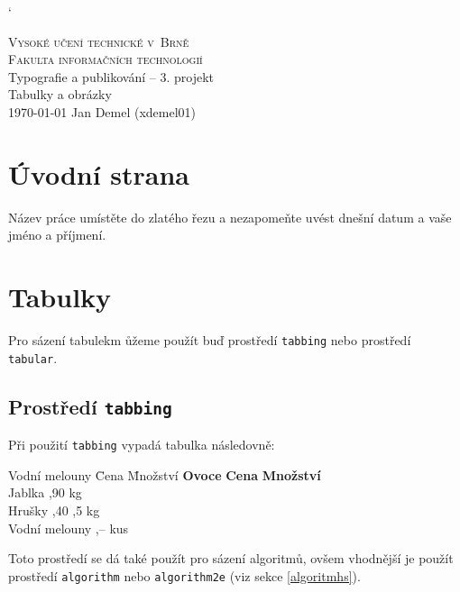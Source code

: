 \documentclass[a4paper, 11pt]{article}
\begin{document}
\catcode`

    \begin{titlepage}
        \begin{center}
            {\Huge\textsc{
                Vysoké učení technické v~Brně\\
            }}
            {\huge\textsc{
                Fakulta informačních technologií\\
            }}
    		{\LARGE
    			Typografie a publikování – 3. projekt \\
    		}
    		{\Huge Tabulky a obrázky\\}
    		{\Large
    			\today
    			\hfill
    			Jan Demel (xdemel01)
    		}
        \end{center}
    \end{titlepage}
    
    \section{Úvodní strana}
    Název práce umístěte do zlatého řezu a nezapomeňte uvést dnešní datum a vaše jméno a příjmení.
    
    \section{Tabulky}
    Pro sázení tabulekm ůžeme použít buď prostředí \texttt{tabbing} nebo prostředí \texttt{tabular}.
    
    \subsection{Prostředí \texttt{tabbing}}
    Při použití \texttt{tabbing} vypadá tabulka následovně:
    \begin{tabbing}
        Vodní melouny \quad \= Cena \quad \= Množství \kill
        \textbf{Ovoce} \> \textbf{Cena}  \> \textbf{Množství} \\
        Jablka ,90  kg \\
        Hrušky ,40 ,5 kg \\
        Vodní melouny ,–  kus \\
    \end{tabbing}

    \noindent Toto prostředí se dá také použít pro sázení algoritmů, ovšem vhodnější je použít prostředí \texttt{algorithm} nebo \texttt{algorithm2e} (viz sekce \ref{algoritmhs}).
    
\end{document}
